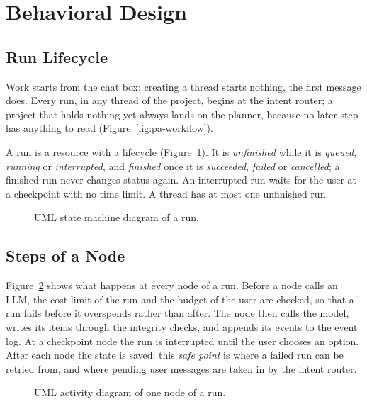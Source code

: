 \section{Behavioral Design}
\label{sec:sd-behavior}

\subsection{Run Lifecycle}
\label{sec:sd-run-lifecycle}

Work starts from the chat box: creating a thread starts nothing, the first message does. Every run, in any thread of the project, begins at the intent router; a project that holds nothing yet always lands on the planner, because no later step has anything to read (Figure~\ref{fig:pa-workflow}).

A run is a resource with a lifecycle (Figure~\ref{fig:sd-run-lifecycle}). It is \emph{unfinished} while it is \emph{queued}, \emph{running} or \emph{interrupted}, and \emph{finished} once it is \emph{succeeded}, \emph{failed} or \emph{cancelled}; a finished run never changes status again. An interrupted run waits for the user at a checkpoint with no time limit. A thread has at most one unfinished run.

\begin{figure}[H]
    \centering
    \resizebox{0.9\linewidth}{!}{}
    \caption{UML state machine diagram of a run.}
    \label{fig:sd-run-lifecycle}
\end{figure}

\subsection{Steps of a Node}
\label{sec:sd-node-steps}

Figure~\ref{fig:sd-node-steps} shows what happens at every node of a run. Before a node calls an LLM, the cost limit of the run and the budget of the user are checked, so that a run fails before it overspends rather than after. The node then calls the model, writes its items through the integrity checks, and appends its events to the event log. At a checkpoint node the run is interrupted until the user chooses an option. After each node the state is saved: this \emph{safe point} is where a failed run can be retried from, and where pending user messages are taken in by the intent router.

\begin{figure}[H]
    \centering
    \resizebox{!}{0.6\textheight}{}
    \caption{UML activity diagram of one node of a run.}
    \label{fig:sd-node-steps}
\end{figure}

